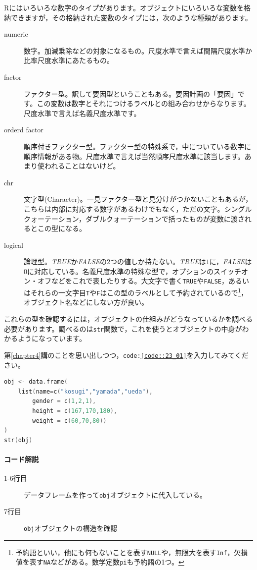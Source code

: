 \documentclass{ltjsarticle}
\begin{document}
Rにはいろいろな数字のタイプがあります。オブジェクトにいろいろな変数を格納できますが，その格納された変数のタイプには，次のような種類があります。
\begin{description}
    \item[numeric] 数字。加減乗除などの対象になるもの。尺度水準で言えば間隔尺度水準か比率尺度水準にあたるもの。
    \item[factor] ファクター型。訳して要因型ということもある。要因計画の「要因」です。この変数は数字とそれにつけるラベルとの組み合わせからなります。尺度水準で言えば名義尺度水準です。
    \item[orderd factor] 順序付きファクター型。ファクター型の特殊系で，中についている数字に順序情報がある物。尺度水準で言えば当然順序尺度水準に該当します。あまり使われることはないけど。
    \item[chr] 文字型(Character)。一見ファクター型と見分けがつかないこともあるが，こちらは内部に対応する数字があるわけでもなく，ただの文字。シングルクォーテーション，ダブルクォーテーションで括ったものが変数に渡されるとこの型になる。
    \item[logical] 論理型。\textit{TRUE}か\textit{FALSE}の2つの値しか持たない。\textit{TRUE}は$1$に，\textit{FALSE}は$0$に対応している。名義尺度水準の特殊な型で，オプションのスイッチオン・オフなどをこれで表したりする。大文字で書く\texttt{TRUE}や\texttt{FALSE}，あるいはそれらの一文字目\texttt{T}や\texttt{F}はこの型のラベルとして予約されているので\footnote{予約語といい，他にも何もないことを表す\texttt{NULL}や，無限大を表す\texttt{Inf}，欠損値を表す\texttt{NA}などがある。数学定数\texttt{pi}も予約語の1つ。}，オブジェクト名などにしない方が良い。
\end{description}
これらの型を確認するには，オブジェクトの仕組みがどうなっているかを調べる必要があります。調べるのは\texttt{str}関数で，これを使うとオブジェクトの中身がわかるようになっています。

第\ref{chapter4}講のことを思い出しつつ，\texttt{code:\ref{code::23_01}}を入力してみてください。
\begin{lstlisting}[language=c++,label={code::23_01},caption={オブジェクトに代入}]
obj <- data.frame(
    list(name=c("kosugi","yamada","ueda"),
        gender = c(1,2,1),
        height = c(167,170,180),
        weight = c(60,70,80))
)
str(obj)
\end{lstlisting}
\paragraph{コード解説}
\begin{description}
    \item[1-6行目] データフレームを作って\texttt{obj}オブジェクトに代入している。
    \item[7行目] \texttt{obj}オブジェクトの構造を確認
\end{description}
\end{document}
